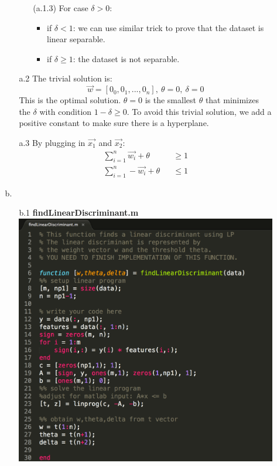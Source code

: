 \begin{enumerate}
\begin{enumerate}
\begin{enumerate}
\begin{enumerate}
				\item[(a.1.3)] For case $\delta > 0$:
				\begin{itemize}
					\item if $\delta < 1$: we can use similar trick to prove that the dataset is linear separable.
					\item if $\delta \geq 1$: the dataset is not separable.
				\end{itemize}
			\end{enumerate}
			\item[a.2] The trivial solution is:
			\begin{displaymath}
				\vec{w} = [0_0, 0_1,...,0_n], \: \theta = 0, \: \delta = 0
			\end{displaymath}
			This is the optimal solution. $\theta = 0$ is the smallest $\theta$ that minimizes the $\delta$ with condition $1-\delta \geq 0$. To avoid this trivial solution, we add a positive constant to make sure there is a hyperplane. 
			\item[a.3] By plugging in $\vec{x_1}$ and $\vec{x_2}$:
			\begin{eqnarray}
				\sum_{i=1}^{n} \vec{w_i} + \theta &&\geq 1\\
				\sum_{i=1}^{n} -\vec{w_i} + \theta &&\leq 1
			\end{eqnarray}
		\end{enumerate}
	\item[b.]
		\begin{enumerate}
			\item[b.1] \textbf{findLinearDiscriminant.m} \\
			\includegraphics[width=13cm]{code_1} \\

\end{enumerate}
\end{enumerate}
\end{enumerate}
